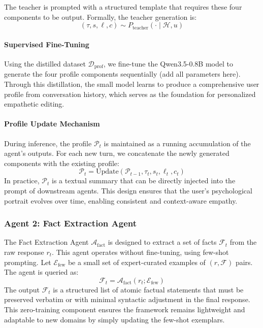 \documentclass[11pt]{article}
\begin{document}
The teacher is prompted with a structured template that requires these four components to be output. Formally, the teacher generation is:
\begin{equation}
    (\tau, s, \ell, c) \sim P_{\text{teacher}}(\cdot \mid \mathcal{H}, u)
\end{equation}

\paragraph{Supervised Fine-Tuning}

Using the distilled dataset $\mathcal{D}_{\text{prof}}$, we fine-tune the Qwen3.5-0.8B model to generate the four profile components sequentially (add all parameters here). Through this distillation, the small model learns to produce a comprehensive user profile from conversation history, which serves as the foundation for personalized empathetic editing.

\paragraph{Profile Update Mechanism}

During inference, the profile $\mathcal{P}_t$ is maintained as a running accumulation of the agent's outputs. For each new turn, we concatenate the newly generated components with the existing profile:
\begin{equation}
    \mathcal{P}_t = \text{Update}(\mathcal{P}_{t-1}, \tau_t, s_t, \ell_t, c_t)
\end{equation}
In practice, $\mathcal{P}_t$ is a textual summary that can be directly injected into the prompt of downstream agents. This design ensures that the user's psychological portrait evolves over time, enabling consistent and context-aware empathy.

\subsubsection{Agent 2: Fact Extraction Agent}
\label{subsec:agent_fact}

The Fact Extraction Agent $\mathcal{A}_{\text{fact}}$ is designed to extract a set of facts $\mathcal{F}_t$ from the raw response $r_t$. This agent operates without fine-tuning, using few-shot prompting. Let $\mathcal{E}_{\text{few}}$ be a small set of expert-curated examples of $(r, \mathcal{F})$ pairs. The agent is queried as:
\begin{equation}
    \mathcal{F}_t = \mathcal{A}_{\text{fact}}(r_t; \mathcal{E}_{\text{few}})
\end{equation}
The output $\mathcal{F}_t$ is a structured list of atomic factual statements that must be preserved verbatim or with minimal syntactic adjustment in the final response. This zero-training component ensures the framework remains lightweight and adaptable to new domains by simply updating the few-shot exemplars.
\end{document}

